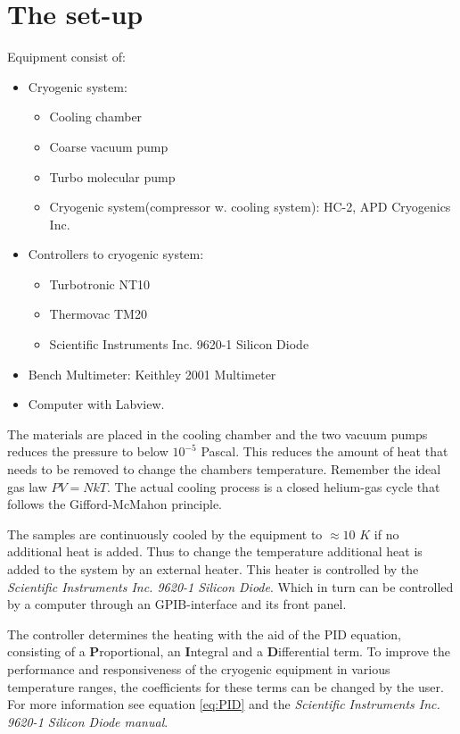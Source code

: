 \documentclass[a4paper,12pt]{article}
\begin{document}
\section{The set-up}
Equipment consist of:
\begin{itemize}
\item Cryogenic system:
\begin{itemize}
\item Cooling chamber
\item Coarse vacuum pump
\item Turbo molecular pump
\item Cryogenic system(compressor w. cooling system): HC-2, APD Cryogenics Inc.
\end{itemize}
\item Controllers to cryogenic system: 
\begin{itemize}
\item Turbotronic NT10
\item Thermovac TM20
\item Scientific Instruments Inc. 9620-1 Silicon Diode
\end{itemize} 
\item Bench Multimeter: Keithley 2001 Multimeter
\item Computer with Labview.
\end{itemize}

The materials are placed in the cooling chamber and the two vacuum pumps reduces the pressure to below $10^{-5}$ Pascal. This reduces the amount of heat that needs to be removed to change the chambers temperature. Remember the ideal gas law $PV=NkT$. The actual cooling process is a closed helium-gas cycle that follows the Gifford-McMahon principle.

The samples are continuously cooled by the equipment to $\approx 10$ $K$ if no additional heat is added. Thus to change the temperature additional heat is added to the system by an external heater. This heater is controlled by the \emph{Scientific Instruments Inc. 9620-1 Silicon Diode}. Which in turn can be controlled by a computer through an GPIB-interface and its front panel. 

The controller determines the heating with the aid of the PID equation, consisting of a \textbf{P}roportional, an \textbf{I}ntegral and a \textbf{D}ifferential term. To improve the performance and responsiveness of the cryogenic equipment in various temperature ranges, the coefficients for these terms can be changed by the user. For more information see equation \eqref{eq:PID} and the \emph{Scientific Instruments Inc. 9620-1 Silicon Diode manual}.
\end{document}
